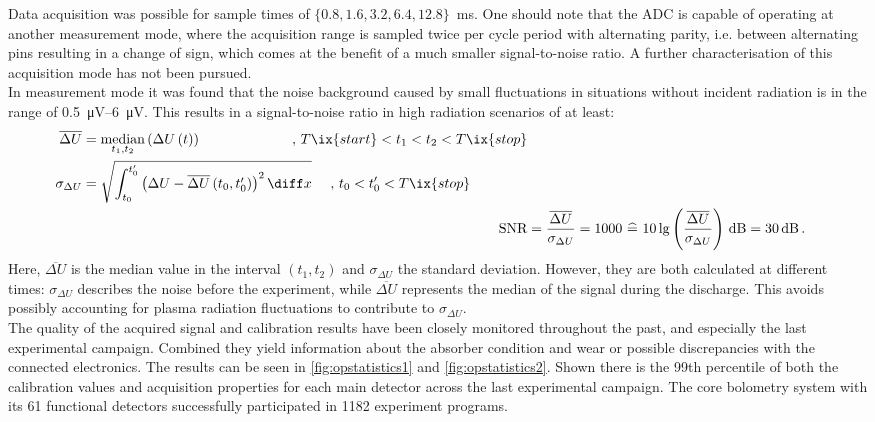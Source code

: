             Data acquisition was possible for sample times of $\{0.8, 1.6, 3.2, 6.4, 12.8\}$\SI{}{\milli\second}. One should note that the ADC is capable of operating at another measurement mode, where the acquisition range is sampled twice per cycle period with alternating parity, i.e. between alternating pins resulting in a change of sign, which comes at the benefit of a much smaller signal-to-noise ratio. A further characterisation of this acquisition mode has not been pursued.\\%
            In measurement mode it was found that the noise background caused by small fluctuations in situations without incident radiation is in the range of \SIrange{0.5}{6}{\micro\volt}. This results in a signal-to-noise ratio in high radiation scenarios of at least:%
%
            \begin{align}%
                \begin{split}\label{eq:median_sigma}%
                    \overline{\Delta U}&=\underset{t_{1},t_{2}}{\text{median}}\left(\Delta U\left(t\right)\right)\qquad\qquad\qquad\,\,\,,\,T\ix{start}<t_{1}<t_{2}<T\ix{stop}\\%
                    \sigma_{\Delta U}&=\sqrt{\int_{t_{0}}^{t_{0}^\prime}\left(\Delta U-\overline{\Delta U}\left(t_{0},t_{0}^\prime\right)\right)^2\diff x}\quad\,\,,\,t_{0}<t_{0}^\prime<T\ix{stop}%
                \end{split}\\%
                \text{SNR}&=\frac{\overline{\Delta U}}{\sigma_{\Delta U}}=1000\,\,\widehat{=}\,\,10\lg\left(\frac{\overline{\Delta U}}{\sigma_{\Delta U}}\right)\,\text{dB}=30\,\text{dB}\,.\nonumber%
            \end{align}%
%
            Here, $\overline{\Delta U}$ is the median value in the interval $\left(t_{1},t_{2}\right)$ and $\sigma_{\Delta U}$ the standard deviation. However, they are both calculated at different times: $\sigma_{\Delta U}$ describes the noise before the experiment, while $\overline{\Delta U}$ represents the median of the signal during the discharge. This avoids possibly accounting for plasma radiation fluctuations to contribute to $\sigma_{\Delta U}$.\\%
            The quality of the acquired signal and calibration results have been closely monitored throughout the past, and especially the last experimental campaign. Combined they yield information about the absorber condition and wear or possible discrepancies with the connected electronics. The results can be seen in \cref{fig:opstatistics1} and \cref{fig:opstatistics2}. Shown there is the 99th percentile of both the calibration values and acquisition properties for each main detector across the last experimental campaign. The core bolometry system with its 61 functional detectors successfully participated in 1182 experiment programs.\\%
